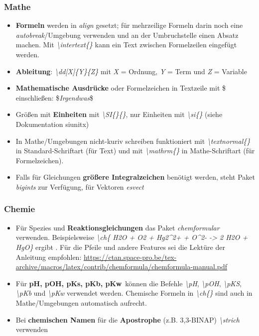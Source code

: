 \documentclass[../main.tex]{subfiles}
\begin{document}
\subsubsection{Mathe}
\begin{itemize}
    \item \textbf{Formeln} werden in \textit{align} gesetzt; f\"ur mehrzeilige Formeln darin noch eine \textit{autobreak}\-/Umgebung verwenden und an der Umbruchstelle einen Absatz machen. Mit \textit{\hypertarget{intertext}{\textbackslash intertext\{\}}} kann ein Text zwischen Formelzeilen eingef\"ugt werden.  
    \item \textbf{Ableitung}: \textit{\hypertarget{dd}{\textbackslash dd[X]\{Y\}\{Z\}}} mit \textit{X} = Ordnung, \textit{Y} = Term und \textit{Z} = Variable  
    \item \textbf{Mathematische Ausdr\"ucke} oder Formelzeichen in Textzeile mit \$ einschlie\ss{}en:  \$\textit{Irgendwas}\$ 
    \item \hypertarget{SI}{} Gr\"o\ss{}en mit \textbf{Einheiten} mit \textit{\textbackslash SI\{\}\{\}}, nur Einheiten mit \textit{\textbackslash si\{\}} (siehe Dokumentation siunitx)
    \item In Mathe\-/Umgebungen nicht-kuriv schreiben funktioniert mit \hypertarget{textnormal}{\textit{\textbackslash textnormal\{\}}} in Standard-Schriftart (f\"ur Text) und mit \hypertarget{mathrm}{\textit{\textbackslash mathrm\{\}}} in Mathe-Schriftart (f\"ur Formelzeichen). 
    \item Falls f\"ur Gleichungen \textbf{gr\"o\ss{}ere Integralzeichen} ben\"otigt werden, steht Paket \textit{bigints} zur Verf\"ugung, f\"ur Vektoren \textit{esvect}
\end{itemize}
\subsubsection{Chemie}
\begin{itemize}
    \item F\"ur Spezies und \textbf{Reaktionsgleichungen} das Paket \textit{chemformular} verwenden. Beispielsweise \textit{\hypertarget{ch}{\textbackslash ch}\{ H2O + O2 + Hg2\textasciicircum2+ + O\textasciicircum2- -> 2 H2O + HgO\}} ergibt . F\"ur die Pfeile und andere Features sei die Lekt\"ure der Anleitung empfohlen:  \url{https://ctan.space-pro.be/tex-archive/macros/latex/contrib/chemformula/chemformula-manual.pdf}
    \item F\"ur \textbf{pH, pOH, pKs, pKb, pKw}~k\"onnen die Befehle \hypertarget{pH}{} \hypertarget{pKs}{} \hypertarget{pKb}{} \hypertarget{pKw}{} \hypertarget{pOH}{} \textit{\textbackslash pH}, \textit{\textbackslash pOH}, \textit{\textbackslash pKS}, \textit{\textbackslash pKb} und \textit{\textbackslash pKw} verwendet werden. Chemische Formeln in \textit{\textbackslash ch\{\}} sind auch in Mathe\-/Umgebungen automatisch aufrecht.
    \item Bei \textbf{chemischen Namen} f\"ur die \textbf{Apostrophe} (z.B. 3,3\strich-BINAP) \hypertarget{strich}{\textit{\textbackslash strich}} verwenden
\end{itemize}
\end{document}
